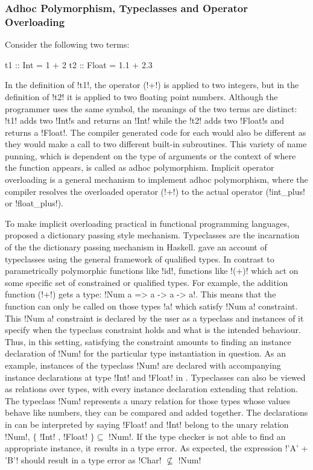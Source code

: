 \documentclass[manuscript,screen,nonacm]{acmart}
\begin{document}
\subsubsection{Adhoc Polymorphism, Typeclasses and Operator Overloading}
Consider the following two terms:

\begin{CenteredBox}
\begin{code}
t1 :: Int = 1 + 2
t2 :: Float = 1.1 + 2.3
\end{code}
\end{CenteredBox}
In the definition of !t1!, the operator (!+!) is applied to two integers, but in the definition of !t2! it is applied to two floating point numbers. Although the programmer uses the same symbol, the meanings of the two terms are distinct: !t1! adds two !Int!s and returns an !Int! while the !t2! adds two !Float!s and returns a !Float!. The compiler generated code for each would also be different as they would make a call to two different built-in subroutines. This variety of name punning, which is dependent on the type of arguments or the context of where the function appears, is called as adhoc polymorphism\cite{strachey_fundamental_2000}. Implicit operator overloading is a general mechanism to implement adhoc polymorphism, where the compiler resolves the overloaded operator (!+!) to the actual operator (!int_plus! or !float_plus!).

To make implicit overloading practical in functional programming languages, \citet{wadler_polymorphism_1989} proposed a dictionary passing style mechanism. Typeclasses are the incarnation of the the dictionary passing mechanism in Haskell. \citet{jones_qualified_1994} gave an account of typeclasses using the general framework of qualified types. In contrast to parametrically polymorphic functions like !id!, functions like !(+)! which act on some specific set of constrained or qualified types. For example, the addition function (!+!) gets a type: !Num a => a -> a -> a!. This means that the function can only be called on those types !a! which satisfy !Num a! constraint. This !Num a! constraint is declared by the user as a typeclass and instances of it specify when the typeclass constraint holds and what is the intended behaviour. Thus, in this setting, satisfying the constraint amounts to finding an instance declaration of !Num! for the particular type instantiation in question. As an example, instances of the typeclass !Num! are declared with accompanying instance declarations at type !Int! and !Float! in . Typeclasses can also be viewed as relations over types, with every instance declaration extending that relation. The typeclass !Num! represents a unary relation for those types whose values behave like numbers, they can be compared and added together. The declarations in  can be interpreted by saying !Float! and !Int! belong to the unary relation !Num!, $\{$ !Int! , !Float! $\} \subseteq $ !Num!. If the type checker is not able to find an appropriate instance, it results in a type error. As expected, the expression !'A' + 'B'! should result in a type error as !Char! $\not\subseteq$ !Num!
\end{document}
